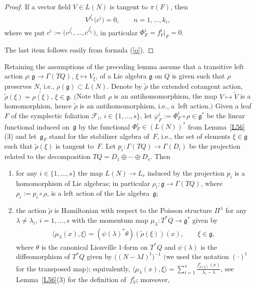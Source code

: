 \begin{proof}
If a vector field $V\in L(N)$ is tangent to $\pi(F)$, then
\begin{gather*}
 V^{j^i_n}\big(c^i\big)=0,\qquad n=1,\dots,k_i,
\end{gather*}
where we put $c^i:=\big(c^{j^i_1},\dots,c^{j^i_{k_i}}\big)$, in particular $\Phi^i_F=f^i_V|_F=0$.

The last item follows easily from formula (\ref{o}).
\end{proof}

\begin{Lemma}\label{lemk}Retaining the assumptions of the preceding lemma assume that a transitive left action $\rho\colon \mathfrak{g}\to\Gamma(TQ)$, $\xi\mapsto V_\xi$, of a Lie algebra $\mathfrak{g}$ on $Q$ is given such that $\rho$ preserves $N$, i.e., $\rho(\mathfrak{g}) \subset L(N)$.
 Denote by $\tilde\rho$ the extended cotangent action, $\tilde\rho(\xi)=\widetilde{\rho(\xi)}$, $\xi\in\mathfrak{g}$. $($Note that $\rho$ is an antihomomorphism, the map $V\mapsto \widetilde{V}$ is a homomorphism, hence $\tilde\rho$ is an antihomomorphism, i.e., a~left action.$)$ Given a leaf $F$ of the symplectic foliation $\mathcal{F}_i$, $i\in\{1,\dots,s\}$, let $\varphi^i_F:=\Phi^i_F\circ\rho\in\mathfrak{g}^*$ be the linear functional induced on~$\mathfrak{g}$ by the functional $\Phi_F^i\in(L(N))^*$ from Lemma~{\rm \ref{L56}(3)} and let~$\mathfrak{g}_F$ stand for the stabilizer algebra of~$F$, i.e., the set of elements $\xi\in\mathfrak{g}$ such that $\tilde{\rho}(\xi)$ is tangent to~$F$. Let $p_i\colon \Gamma(TQ)\to \Gamma(D_i)$ be the projection related to the decomposition $TQ=D_1\oplus\cdots\oplus D_s$. Then
 \begin{enumerate}\itemsep=0pt
 \item[$1)$] for any $i\in\{1,\dots,s\}$ the map $L(N)\to L_r$ induced by the projection $p_i$ is a homomorphism of Lie algebras; in particular $\rho_i\colon \mathfrak{g}\to\Gamma(TQ)$, where $\rho_i:=p_i\circ\rho$, is a left action of the Lie algebra~$\mathfrak{g}$;
 \item[$2)$] the action $\tilde\rho$ is Hamiltonian with respect to the Poisson structure $\Pi^\lambda$ for any $\lambda\not=\lambda_i$, $i=1,\dots,s$ with the momentum map $\mu_\lambda\colon T^*Q\to \mathfrak{g}^*$ given by
 \begin{gather}\label{mom0}
 \langle\mu_\lambda(x),\xi\rangle=(\psi(\lambda)^*\theta)(\tilde\rho(\xi))(x),\qquad \xi\in \mathfrak{g},
 \end{gather}
 where $\theta$ is the canonical Liouville $1$-form on $T^*Q$ and $\psi(\lambda)$ is the diffeomorphism of $T^*Q$ given by $\big((N-\lambda I)^t\big)^{-1}$ $($we used the notation $(\cdot)^t$ for the transposed map$)$; equivalently, $\langle\mu_\lambda(x),\xi\rangle=\sum\limits_{i=1}^s\frac{f^i_{\rho(\xi)}(x)}{\lambda_i-\lambda}$, see Lemma~{\rm \ref{L56}(3)} for the definition of~$f^i_{V}$; moreover,

\end{enumerate}
\end{Lemma}
